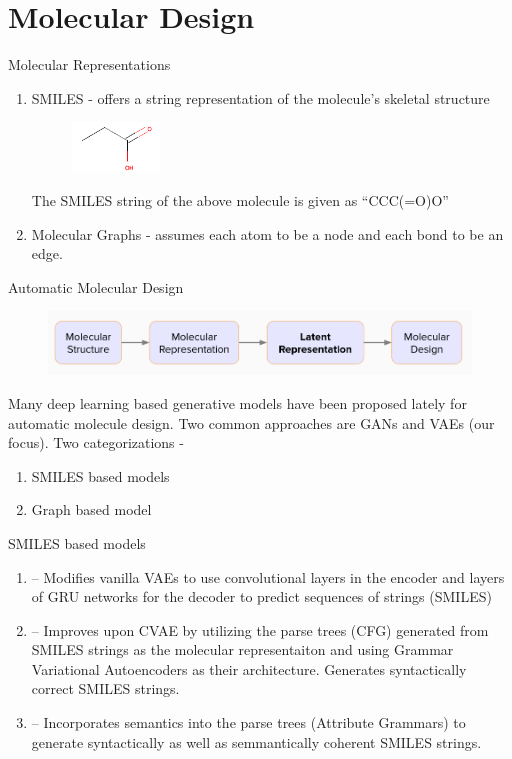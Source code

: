 \documentclass[9pt]{beamer}
\begin{document}
\section{Molecular Design}
\begin{frame}{Molecular Representations}
	\begin{enumerate}
		\item <1-> SMILES - offers a string representation of the molecule's skeletal structure
			\begin{figure}[htpb]
				\centering
				\includegraphics[height=50px]{includes/smiles-example.png}
			\end{figure}
			The SMILES string of the above molecule is given as ``CCC(=O)O''
		\item <2-> Molecular Graphs - assumes each atom to be a node and each bond to be an edge.
	\end{enumerate}
\end{frame}

\begin{frame}{Automatic Molecular Design}
	\begin{figure}[htpb]
		\centering
		\includegraphics[width=\textwidth]{includes/mol-design.png}
	\end{figure}
	Many deep learning based generative models have been proposed lately for automatic molecule design. Two common approaches are GANs and VAEs (our focus). Two categorizations -
	\begin{enumerate}
		\item SMILES based models
		\item Graph based model
	\end{enumerate}
\end{frame}

\begin{frame}{SMILES based models}
	\begin{enumerate}
		\item <1->  -- Modifies vanilla VAEs to use convolutional layers in the encoder and layers of GRU networks for the decoder to predict sequences of strings (SMILES)
		\item <2->  -- Improves upon CVAE by utilizing the parse trees (CFG) generated from SMILES strings as the molecular representaiton and using Grammar Variational Autoencoders as their architecture. Generates syntactically correct SMILES strings.
		\item <3->  -- Incorporates semantics into the parse trees (Attribute Grammars) to generate syntactically as well as semmantically coherent SMILES strings.
	\end{enumerate}
\end{frame}
\end{document}
